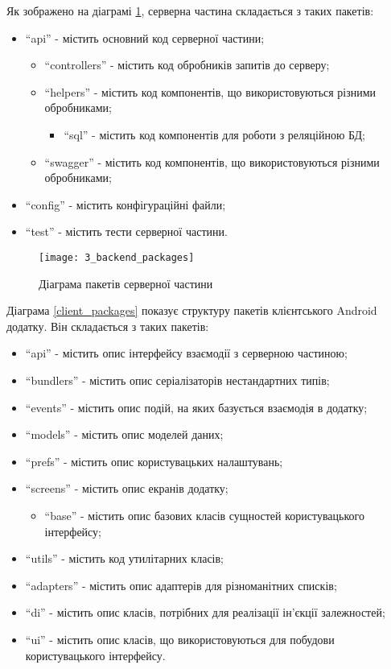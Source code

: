 \documentclass[../main.tex]{subfiles}
\begin{document}
Як зображено на діаграмі \ref{server_packages}, серверна частина складається з таких пакетів:
\begin{itemize}
	\item \enquote{api} - містить основний код серверної частини;
	\begin{itemize}
		\item \enquote{controllers} - містить код обробників запитів до серверу;
		\item \enquote{helpers} - містить код компонентів, що використовуються різними обробниками;
		\begin{itemize}
			\item \enquote{sql} - містить код компонентів для роботи з реляційною БД;
		\end{itemize}
		\item \enquote{swagger} - містить код компонентів, що використовуються різними обробниками;
	\end{itemize}
	\item \enquote{config} - містить конфігураційні файли;
	\item \enquote{test} - містить тести серверної частини.
\end{itemize}

\begin{figure}[H]
	\centering
	\texttt{[image: 3\_backend\_packages]}
	\caption{Діаграма пакетів серверної частини}
	\label{server_packages}
\end{figure}


Діаграма \ref{client_packages} показує структуру пакетів клієнтського Android додатку. Він складається з таких пакетів:
\begin{itemize}
	\item \enquote{api} - містить опис інтерфейсу взаємодії з серверною частиною;
	\item \enquote{bundlers} - містить опис серіалізаторів нестандартних типів;
	\item \enquote{events} - містить опис подій, на яких базується взаємодія в додатку;
	\item \enquote{models} - містить опис моделей даних;
	\item \enquote{prefs} - містить опис користувацьких налаштувань;
	\item \enquote{screens} - містить опис екранів додатку;
	\begin{itemize}
		\item \enquote{base} - містить опис базових класів сущностей користувацького інтерфейсу;
	\end{itemize}
	\item \enquote{utils} - містить код утилітарних класів;
	\item \enquote{adapters} - містить опис адаптерів для різноманітних списків;
	\item \enquote{di} - містить опис класів, потрібних для реалізації ін'єкції залежностей;
	\item \enquote{ui} - містить опис класів, що використовуються для побудови користувацького інтерфейсу.
\end{itemize}
\end{document}
